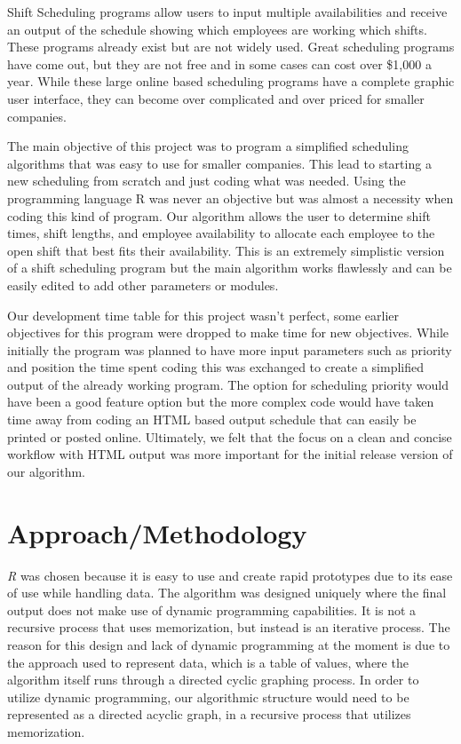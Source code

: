 \documentclass[a4paper,11pt]{article}
\begin{document}
Shift Scheduling programs allow users to input multiple availabilities and receive an output of the schedule showing which employees are working which shifts.  These programs already exist but are not widely used.  Great scheduling programs have come out, but they are not free and in some cases can cost over \$1,000 a year.  While these large online based scheduling programs have a complete graphic user interface, they can become over complicated and over priced for smaller companies.

The main objective of this project was to program a simplified scheduling algorithms that was easy to use for smaller companies.  This lead to starting a new scheduling from scratch and just coding what was needed.  Using the programming language R was never an objective but was almost a necessity when coding this kind of program.  Our algorithm allows the user to determine shift times, shift lengths, and employee availability to allocate each employee to the open shift that best fits their availability.  This is an extremely simplistic version of a shift scheduling program but the main algorithm works flawlessly and can be easily edited to add other parameters or modules. 

 Our development time table for this project wasn’t perfect, some earlier objectives for this program were dropped to make time for new objectives. While initially the program was planned to have more input parameters such as priority and position the time spent coding this was exchanged to create a simplified output of the already working program.  The option for scheduling priority would have been a good feature option but the more complex code would have taken time away from coding an HTML based output schedule that can easily be printed or posted online. Ultimately, we felt that the focus on a clean and concise workflow with HTML output was more important for the initial release version of our algorithm.

\section{Approach/Methodology}

\textit{R} was chosen because it is easy to use and create rapid prototypes due to its ease of use while handling data. The algorithm was designed uniquely where the final output does not make use of dynamic programming capabilities. It is not a recursive process that uses memorization, but instead is an iterative process. The reason for this design and lack of dynamic programming at the moment is due to the approach used to represent data, which is a table of values, where the algorithm itself runs through a directed cyclic graphing process. In order to utilize dynamic programming, our algorithmic structure would need to be represented as a directed acyclic graph, in a recursive process that utilizes memorization. 
\end{document}

